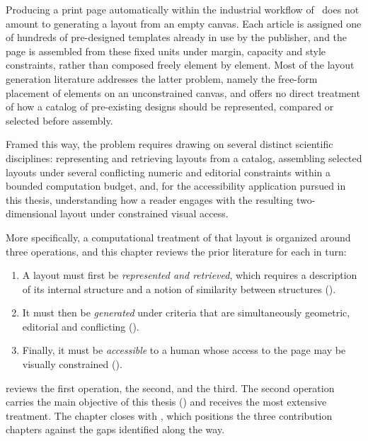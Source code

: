 
\label{sec:sota-scope}

Producing a print page automatically within the industrial workflow of \melody\ does not amount to generating a layout from an empty canvas. Each article is assigned one of hundreds of pre-designed templates already in use by the publisher, and the page is assembled from these fixed units under margin, capacity and style constraints, rather than composed freely element by element. Most of the layout generation literature addresses the latter problem, namely the free-form placement of elements on an unconstrained canvas, and offers no direct treatment of how a catalog of pre-existing designs should be represented, compared or selected before assembly.

Framed this way, the problem requires drawing on several distinct scientific disciplines: representing and retrieving layouts from a catalog, assembling selected layouts under several conflicting numeric and editorial constraints within a bounded computation budget, and, for the accessibility application pursued in this thesis, understanding how a reader engages with the resulting two-dimensional layout under constrained visual access.

More specifically, a computational treatment of that layout is organized around three operations, and this chapter reviews the prior literature for each in turn:

\begin{enumerate}
    \item A layout must first be \emph{represented and retrieved}, which requires a description of its internal structure and a notion of similarity between structures ().
    \item It must then be \emph{generated} under criteria that are simultaneously geometric, editorial and conflicting ().
    \item Finally, it must be \emph{accessible} to a human whose access to the page may be visually constrained ().
\end{enumerate}

 reviews the first operation,  the second, and  the third. The second operation carries the main objective of this thesis () and receives the most extensive treatment. The chapter closes with , which positions the three contribution chapters against the gaps identified along the way.
